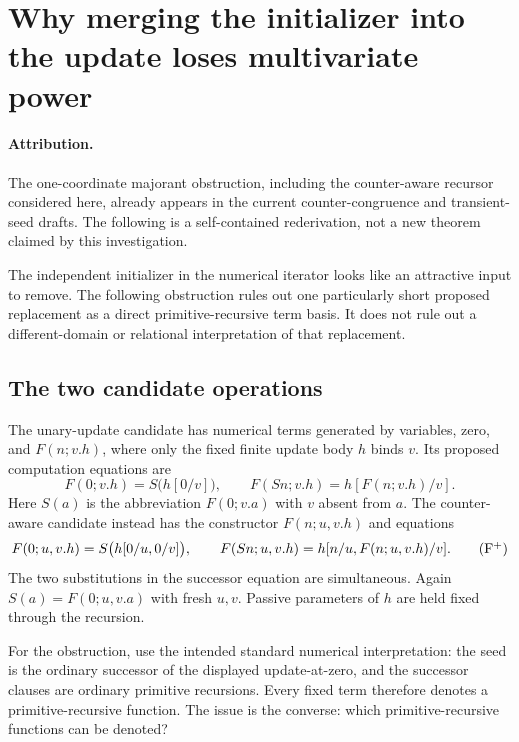 \section{Why merging the initializer into the update loses multivariate power}
\label{app:fused-seed-obstruction}

\paragraph{Attribution.} The one-coordinate majorant obstruction, including the counter-aware recursor considered here, already appears in the current counter-congruence and transient-seed drafts. The following is a self-contained rederivation, not a new theorem claimed by this investigation.~\cite{counter,transient}

The independent initializer in the numerical iterator looks like an
attractive input to remove.  The following obstruction rules out one
particularly short proposed replacement as a direct primitive-recursive
term basis.  It does not rule out a different-domain or relational
interpretation of that replacement.

\subsection{The two candidate operations}

The unary-update candidate has numerical terms generated by variables,
zero, and $F(n;v.h)$, where only the fixed finite update body $h$ binds
$v$.  Its proposed computation equations are
\[
 F(0;v.h)=S\bigl(h[0/v]\bigr),\qquad
 F(Sn;v.h)=h[F(n;v.h)/v].
 \tag{F}
\]
Here $S(a)$ is the abbreviation $F(0;v.a)$ with $v$ absent from $a$.
The counter-aware candidate instead has the constructor $F(n;u,v.h)$
and equations
\[
 F(0;u,v.h)=S\bigl(h[0/u,0/v]\bigr),\qquad
 F(Sn;u,v.h)=h[n/u,F(n;u,v.h)/v].
 \tag{F$^{+}$}
\]
The two substitutions in the successor equation are simultaneous.
Again $S(a)=F(0;u,v.a)$ with fresh $u,v$.  Passive parameters of $h$
are held fixed through the recursion.

For the obstruction, use the intended standard numerical interpretation:
the seed is the ordinary successor of the displayed update-at-zero, and
the successor clauses are ordinary primitive recursions.  Every fixed
term therefore denotes a primitive-recursive function.  The issue is the
converse: which primitive-recursive functions can be denoted?

